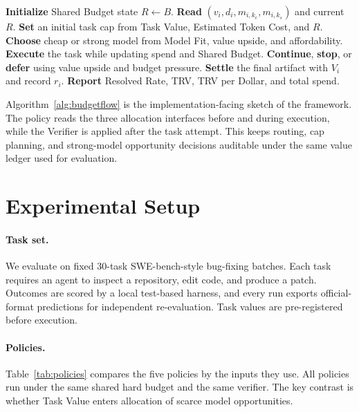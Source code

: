 \documentclass{article}
\newcommand{\trv}{TRV\xspace}
\newcommand{\taskvalue}{Task Value\xspace}
\newcommand{\tokencost}{Estimated Token Cost\xspace}
\newcommand{\modelfit}{Model Fit\xspace}
\newcommand{\sharedbudget}{Shared Budget\xspace}
\newcommand{\verifier}{Verifier\xspace}
\begin{document}
\begin{algorithm}[t]
\caption{BudgetFlow batch policy sketch}
\label{alg:budgetflow}
\begin{algorithmic}[1]
\STATE \textbf{Initialize} \sharedbudget state $R \leftarrow B$.
    \STATE \textbf{Read} $(v_i,d_i,m_{i,k_c},m_{i,k_s})$ and current $R$.
    \STATE \textbf{Set} an initial task cap from \taskvalue, \tokencost, and $R$.
    \STATE \textbf{Choose} cheap or strong model from \modelfit, value upside, and affordability.
    \STATE \textbf{Execute} the task while updating spend and \sharedbudget.
    \STATE \textbf{Continue}, \textbf{stop}, or \textbf{defer} using value upside and budget pressure.
    \STATE \textbf{Settle} the final artifact with $V_i$ and record $r_i$.
\ENDFOR
\STATE \textbf{Report} Resolved Rate, \trv, \trv per Dollar, and total spend.
\end{algorithmic}
\end{algorithm}

Algorithm~\ref{alg:budgetflow} is the implementation-facing sketch of the framework. The policy reads the three allocation interfaces before and during execution, while the \verifier is applied after the task attempt. This keeps routing, cap planning, and strong-model opportunity decisions auditable under the same value ledger used for evaluation.

\section{Experimental Setup}
\label{sec:setup}
\paragraph{Task set.}
We evaluate on fixed 30-task SWE-bench-style bug-fixing batches. Each task requires an agent to inspect a repository, edit code, and produce a patch. Outcomes are scored by a local test-based harness, and every run exports official-format predictions for independent re-evaluation. Task values are pre-registered before execution.

\paragraph{Policies.}
Table~\ref{tab:policies} compares the five policies by the inputs they use. All policies run under the same shared hard budget and the same verifier. The key contrast is whether \taskvalue enters allocation of scarce model opportunities.
\end{document}

